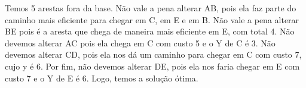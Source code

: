 \documentclass[11pt]{article}
\begin{document}
Temos 5 arestas fora da base. Não vale a pena alterar AB, pois ela faz parte do caminho mais eficiente para chegar em C, em E e em B. Não vale a pena alterar BE pois é a aresta que chega de maneira mais eficiente em E, com total 4. Não devemos alterar AC pois ela chega em C com custo 5 e o Y de C é 3. Não devemos alterar CD, pois ela nos dá um caminho para chegar em C com custo 7, cujo y é 6. Por fim, não devemos alterar DE, pois ela nos faria chegar em E com custo 7 e o Y de E é 6. Logo, temos a solução ótima.
\end{document}
